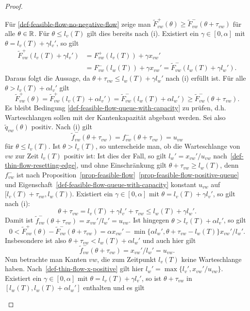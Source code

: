 \begin{proof}
\begin{description}[leftmargin=0cm, topsep=0cm, itemindent=0.5cm]
		Für \ref{def-feasible-flow-no-negative-flow} zeige man $\tilde{F}^+_{vw}(\theta)\geq \tilde{F}_{vw}^-(\theta+\tau_{vw})$ für alle $\theta\in\mathbb{R}$.
		Für $\theta\leq l_v(T)$ gilt dies bereits nach (i).
		Existiert ein $\gamma\in[0, \alpha]$ mit $\theta=l_v(T) + \gamma l_v'$, so gilt
		\begin{align*}
		\tilde{F}_{vw}^+(l_v(T) + \gamma l_v')&=F_{vw}^+(l_v(T))+\gamma x_{vw}'\\
		&= F_{vw}^-(l_w(T))+ \gamma x_{vw}'= \tilde{F}_{vw}^-(l_w(T)+\gamma l_w').
		\end{align*}
		Daraus folgt die Aussage, da $\theta + \tau_{vw}\leq l_w(T) + \gamma l_w'$ nach (i) erfüllt ist.
		Für alle $\theta > l_v(T)+\alpha l_v'$ gilt 
		\[\tilde{F}_{vw}^+(\theta) = \tilde{F}_{vw}^+(l_v(T) + \alpha l_v') = \tilde{F}_{vw}^-(l_w(T) + \alpha l_w') \geq \tilde{F}_{vw}^-(\theta + \tau_{vw}).\]
		Es bleibt Bedingung \ref{def-feasible-flow-queue-with-capacity} zu prüfen, d.h. Warteschlangen sollen mit der Kantenkapazität abgebaut werden.
		Sei also $\tilde{q}_{vw}(\theta)$ positiv.
		Nach (i) gilt 
		\[
		\tilde{f}_{vw}^-(\theta + \tau_{vw}) = f_{vw}^-(\theta + \tau_{vw}) = u_{vw}
		\]
		für $\theta\leq l_v(T)$.
		Ist $\theta > l_v(T)$, so unterscheide man, ob die Warteschlange von $vw$ zur Zeit $l_v(T)$ positiv ist:
		Ist dies der Fall, so gilt $l_w' = x_{vw}' / u_{vw}$ nach~\ref{def-thin-flow-resetting-edge}, und ohne Einschränkung gilt $\theta + \tau_{vw} \geq l_w(T)$, denn $f_{vw}^-$ ist nach Proposition~\ref{prop-feasible-flow}~\ref{prop-feasible-flow-positive-queue} und Eigenschaft~\ref{def-feasible-flow-queue-with-capacity} konstant $u_{vw}$ auf $[l_v(T)+\tau_{vw},l_w(T))$.
		Existiert ein $\gamma\in [0, \alpha]$ mit $\theta = l_v(T) + \gamma l_v'$, so gilt nach (i):
		\[
		\theta + \tau_{vw} = l_v(T) + \gamma l_v' + \tau_{vw} \leq l_w(T) + \gamma l_w'.
		\]
		Damit ist $\tilde{f}^-_{vw}(\theta + \tau_{vw}) = x_{vw}'/l_w' = u_{vw}$.
		Ist hingegen $\theta > l_v(T) + \alpha l_v'$, so gilt
		\[
		0<\tilde{F}^+_{vw}(\theta) - \tilde{F}_{vw}^-(\theta +\tau_{vw}) = \alpha x_{vw}' - \min \{ \alpha l_w', \theta + \tau_{vw} - l_w(T) \} x_{vw}' / l_w'.
		\]
		Insbesondere ist also $\theta + \tau_{vw} < l_w(T) + \alpha l_w'$ und auch hier gilt \[
		\tilde{f}^-_{vw}(\theta + \tau_{vw}) = x_{vw}'/l_w' = u_{vw}.
		\]
		Nun betrachte man Kanten $vw$, die zum Zeitpunkt $l_v(T)$ keine Warteschlange haben.
		Nach~\ref{def-thin-flow-x-positive} gilt hier $l_w' = \max \{ l_v', x_{vw}' / u_{vw} \}$.
		Existiert ein $\gamma\in [0, \alpha]$ mit $\theta = l_v(T) + \gamma l_v'$, so ist $\theta+\tau_{vw}$ in $[l_w(T), l_w(T) + \alpha l_w']$ enthalten und es gilt

\end{description}
\end{proof}
